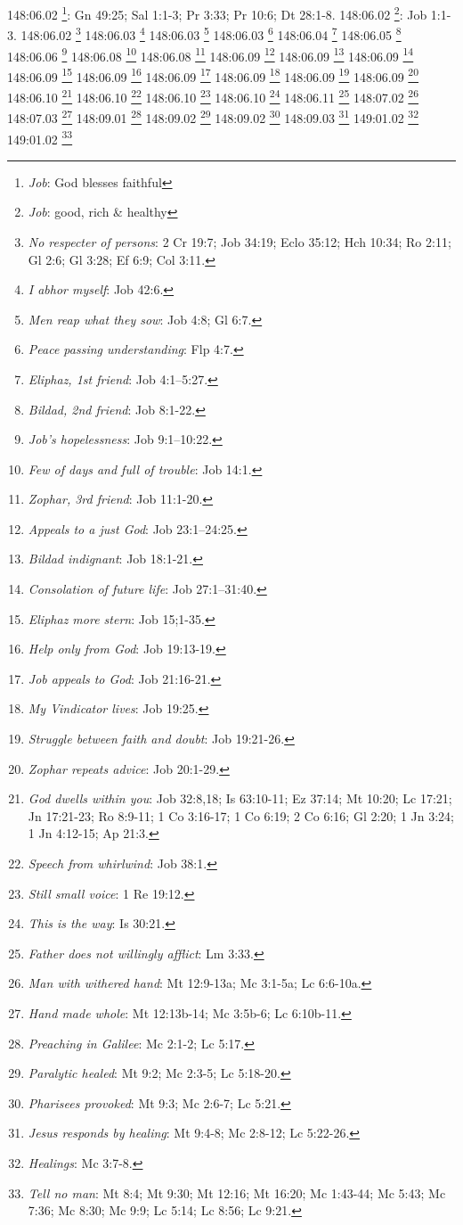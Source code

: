 {{{{{{{{{{{{{{{{{{{{{{{{{{{{148:06.02 \footnote{\textit{Job}: God blesses faithful}: Gn 49:25; Sal 1:1-3; Pr 3:33; Pr 10:6; Dt 28:1-8.}
148:06.02 \footnote{\textit{Job}: good, rich & healthy}: Job 1:1-3.}
148:06.02 \footnote{\textit{No respecter of persons}: 2 Cr 19:7; Job 34:19; Eclo 35:12; Hch 10:34; Ro 2:11; Gl 2:6; Gl 3:28; Ef 6:9; Col 3:11.}
148:06.03 \footnote{\textit{I abhor myself}: Job 42:6.}
148:06.03 \footnote{\textit{Men reap what they sow}: Job 4:8; Gl 6:7.}
148:06.03 \footnote{\textit{Peace passing understanding}: Flp 4:7.}
148:06.04 \footnote{\textit{Eliphaz, 1st friend}: Job 4:1--5:27.}
148:06.05 \footnote{\textit{Bildad, 2nd friend}: Job 8:1-22.}
148:06.06 \footnote{\textit{Job's hopelessness}: Job 9:1--10:22.}
148:06.08 \footnote{\textit{Few of days and full of trouble}: Job 14:1.}
148:06.08 \footnote{\textit{Zophar, 3rd friend}: Job 11:1-20.}
148:06.09 \footnote{\textit{Appeals to a just God}: Job 23:1--24:25.}
148:06.09 \footnote{\textit{Bildad indignant}: Job 18:1-21.}
148:06.09 \footnote{\textit{Consolation of future life}: Job 27:1--31:40.}
148:06.09 \footnote{\textit{Eliphaz more stern}: Job 15;1-35.}
148:06.09 \footnote{\textit{Help only from God}: Job 19:13-19.}
148:06.09 \footnote{\textit{Job appeals to God}: Job 21:16-21.}
148:06.09 \footnote{\textit{My Vindicator lives}: Job 19:25.}
148:06.09 \footnote{\textit{Struggle between faith and doubt}: Job 19:21-26.}
148:06.09 \footnote{\textit{Zophar repeats advice}: Job 20:1-29.}
148:06.10 \footnote{\textit{God dwells within you}: Job 32:8,18; Is 63:10-11; Ez 37:14; Mt 10:20; Lc 17:21; Jn 17:21-23; Ro 8:9-11; 1 Co 3:16-17; 1 Co 6:19; 2 Co 6:16; Gl 2:20; 1 Jn 3:24; 1 Jn 4:12-15; Ap 21:3.}
148:06.10 \footnote{\textit{Speech from whirlwind}: Job 38:1.}
148:06.10 \footnote{\textit{Still small voice}: 1 Re 19:12.}
148:06.10 \footnote{\textit{This is the way}: Is 30:21.}
148:06.11 \footnote{\textit{Father does not willingly afflict}: Lm 3:33.}
148:07.02 \footnote{\textit{Man with withered hand}: Mt 12:9-13a; Mc 3:1-5a; Lc 6:6-10a.}
148:07.03 \footnote{\textit{Hand made whole}: Mt 12:13b-14; Mc 3:5b-6; Lc 6:10b-11.}
148:09.01 \footnote{\textit{Preaching in Galilee}: Mc 2:1-2; Lc 5:17.}
148:09.02 \footnote{\textit{Paralytic healed}: Mt 9:2; Mc 2:3-5; Lc 5:18-20.}
148:09.02 \footnote{\textit{Pharisees provoked}: Mt 9:3; Mc 2:6-7; Lc 5:21.}
148:09.03 \footnote{\textit{Jesus responds by healing}: Mt 9:4-8; Mc 2:8-12; Lc 5:22-26.}
149:01.02 \footnote{\textit{Healings}: Mc 3:7-8.}
149:01.02 \footnote{\textit{Tell no man}: Mt 8:4; Mt 9:30; Mt 12:16; Mt 16:20; Mc 1:43-44; Mc 5:43; Mc 7:36; Mc 8:30; Mc 9:9; Lc 5:14; Lc 8:56; Lc 9:21.}
}}}}}}}}}}}}}}}}}}}}}}}}}}
